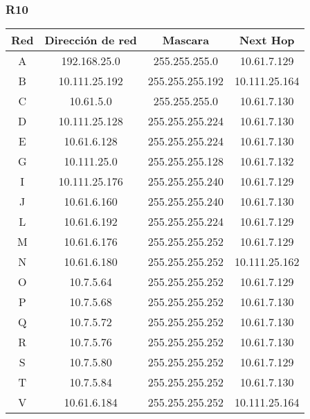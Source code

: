 \subsubsection{R10}
\begin{table}[!htbp]
\centering
  \begin{tabular}{|c|c|c|c|}
    \hline
	Red & Dirección de red & Mascara & Next Hop\\ \hline
	A & 192.168.25.0 & 255.255.255.0 & 10.61.7.129 \\ \hline
	B & 10.111.25.192 & 255.255.255.192 & 10.111.25.164 \\ \hline
	C & 10.61.5.0 & 255.255.255.0 & 10.61.7.130 \\ \hline
	D & 10.111.25.128 & 255.255.255.224 & 10.61.7.130 \\ \hline
	E & 10.61.6.128 & 255.255.255.224 & 10.61.7.130 \\ \hline
	G & 10.111.25.0 & 255.255.255.128 & 10.61.7.132 \\ \hline
	I & 10.111.25.176 & 255.255.255.240 & 10.61.7.129 \\ \hline
	J & 10.61.6.160 & 255.255.255.240 & 10.61.7.130 \\ \hline
	L & 10.61.6.192 & 255.255.255.224 & 10.61.7.129 \\ \hline
	M & 10.61.6.176 & 255.255.255.252 & 10.61.7.129 \\ \hline
	N & 10.61.6.180 & 255.255.255.252 & 10.111.25.162 \\ \hline
	O & 10.7.5.64 & 255.255.255.252 & 10.61.7.129 \\ \hline
	P & 10.7.5.68 & 255.255.255.252 & 10.61.7.130 \\ \hline
	Q & 10.7.5.72 & 255.255.255.252 & 10.61.7.130 \\ \hline
	R & 10.7.5.76 & 255.255.255.252 & 10.61.7.130 \\ \hline
	S & 10.7.5.80 & 255.255.255.252 & 10.61.7.129 \\ \hline
	T & 10.7.5.84 & 255.255.255.252 & 10.61.7.130 \\ \hline
	V & 10.61.6.184 & 255.255.255.252 & 10.111.25.164 \\
    \hline
  \end{tabular}
\end{table}

\newpage
